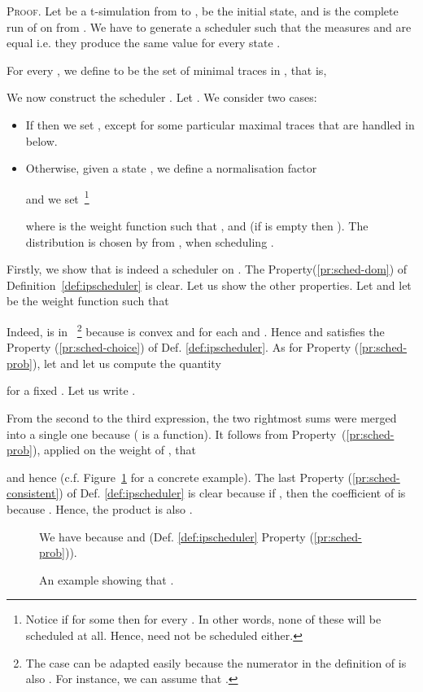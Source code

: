 \documentclass[review]{elsart}
\newenvironment{proof}{\par
\noindent
\textsc{Proof. }
\noindent}{\hfill}
\newcommand{\Defs}[1]{Def. #1}
\begin{document}
\begin{proof}
Let  be a t-simulation from  to ,  be the initial state,  and  is the complete run of  on  from . We have to generate a scheduler  such that the measures  and   are equal i.e. they produce the same value for every state .

For every , we define  to be the set of minimal traces in , that is,

We now construct the scheduler . Let . We consider two cases:
\begin{itemize}
\item If  then we set , except for some particular maximal traces that are handled in  below. 
\item Otherwise, given a state , we define a normalisation factor 

and we set~\footnote{Notice if  for some  then  for every . In other words, none of these  will be scheduled at all. Hence,  need not be scheduled either.}

where  is the weight function such that , and  (if  is empty then ). The distribution  is chosen by  from , when scheduling .
\end{itemize}

Firstly, we show that  is indeed a scheduler on . The Property(\ref{pr:sched-dom}) of Definition~\ref{def:ipscheduler} is clear. Let us show the other properties. Let  and
let  be the weight function such that 

Indeed,  is in ~\footnote{The case  can be adapted easily because the numerator in the definition of  is also . For instance, we can assume that .} because  is convex and for each  and .
Hence  and  satisfies the Property (\ref{pr:sched-choice}) of \Defs{\ref{def:ipscheduler}}. As for Property (\ref{pr:sched-prob}), let  and let us compute the quantity 

for a fixed . Let us write .

From the second to the third expression, the two rightmost sums were merged into a single one because  ( is a function). It follows from Property~(\ref{pr:sched-prob}), applied on the weight  of , that
	
and hence  (c.f. Figure~\ref{fig:6-concrete-sched} for a concrete example). The last Property (\ref{pr:sched-consistent}) of \Defs{\ref{def:ipscheduler}} is clear because if , then the coefficient of  is  because . Hence, the product is also .

\begin{figure}

We have  because  and  (\Defs{\ref{def:ipscheduler}} Property (\ref{pr:sched-prob})).
\caption{An example showing that .}\label{fig:6-concrete-sched}
\end{figure}


\end{proof}
\end{document}
